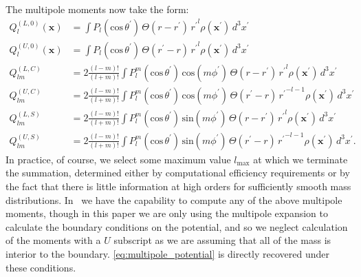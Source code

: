 \documentclass[12pt]{article}
\begin{document}
The multipole moments now take the form:
\begin{align}
  Q_l^{(L,0)}(\mathbf{x}) &= \int P_l(\text{cos}\, \theta^\prime)\, \Theta(r - r^\prime)\, {r^{\prime}}^l \rho(\mathbf{x}^\prime)\, d^3 x^\prime \\
  Q_l^{(U,0)}(\mathbf{x}) &= \int P_l(\text{cos}\, \theta^\prime)\, \Theta(r^\prime - r)\, {r^{\prime}}^l \rho(\mathbf{x}^\prime)\, d^3 x^\prime \\  
  Q_{lm}^{(L,C)} &= 2\frac{(l-m)!}{(l+m)!} \int P_{l}^{m}(\text{cos}\, \theta^\prime)\, \text{cos}(m\phi^\prime)\, \Theta(r - r^\prime)\, {r^\prime}^l \rho(\mathbf{x}^\prime)\, d^3 x^\prime \\
  Q_{lm}^{(U,C)} &= 2\frac{(l-m)!}{(l+m)!} \int P_{l}^{m}(\text{cos}\, \theta^\prime)\, \text{cos}(m\phi^\prime)\, \Theta(r^\prime - r)\, {r^\prime}^{-l-1} \rho(\mathbf{x}^\prime)\, d^3 x^\prime \\
  Q_{lm}^{(L,S)} &= 2\frac{(l-m)!}{(l+m)!} \int P_{l}^{m}(\text{cos}\, \theta^\prime)\, \text{sin}(m\phi^\prime)\, \Theta(r - r^\prime)\, {r^\prime}^l \rho(\mathbf{x}^\prime)\, d^3 x^\prime \\
  Q_{lm}^{(U,S)} &= 2\frac{(l-m)!}{(l+m)!} \int P_{l}^{m}(\text{cos}\, \theta^\prime)\, \text{sin}(m\phi^\prime)\, \Theta(r^\prime - r)\, {r^\prime}^{-l-1} \rho(\mathbf{x}^\prime)\, d^3 x^\prime.  
\end{align}
In practice, of course, we select some maximum value $l_{\text{max}}$ at which we terminate the summation, determined either by computational efficiency requirements or by the fact that there is little information at high orders for sufficiently smooth mass distributions. In \castro\ we have the capability to compute any of the above multipole moments, though in this paper we are only using the multipole expansion to calculate the boundary conditions on the potential, and so we neglect calculation of the moments with a $U$ subscript as we are assuming that all of the mass is interior to the boundary. \autoref{eq:multipole_potential} is directly recovered under these conditions.

\clearpage
\end{document}
